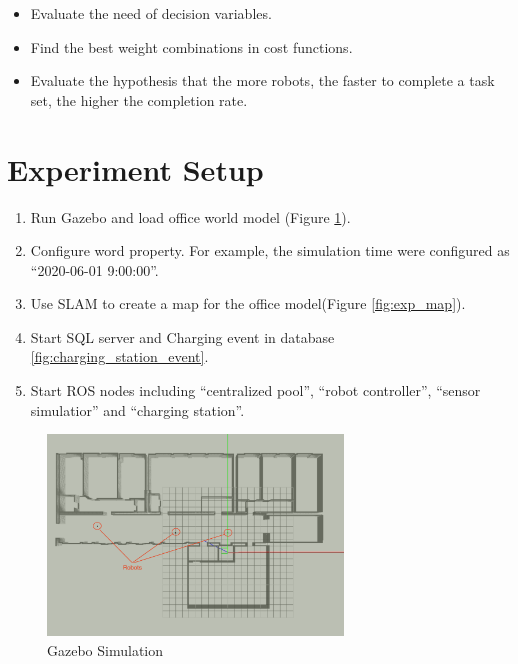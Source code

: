 \begin{itemize}
	\item Evaluate the need of decision variables.
	\item Find the best weight combinations in cost functions.
	\item Evaluate the hypothesis that the more robots, the faster to complete a task set, the higher the completion rate.
\end{itemize}

\section{Experiment Setup}

\begin{enumerate}
    \item Run Gazebo and load office world model (Figure \ref{fig:gazebo_model}). 
    \item Configure word property. For example, the simulation time were configured as ``2020-06-01 9:00:00''.
    \item Use SLAM \cite{T3SLAM} to create a map for the office model(Figure \ref{fig:exp_map}).
    \item Start SQL server and Charging event in database \ref{fig:charging_station_event}.
    \item Start ROS nodes including ``centralized pool'', ``robot controller'', ``sensor simulatior'' and ``charging station''.
\end{enumerate}

\begin{figure}[htbp]
	\centering
	\includegraphics[width = 0.7\textwidth]{content/images/ch5/gazebo_model.png}
	\caption{Gazebo Simulation}
	\label{fig:gazebo_model}
\end{figure}

